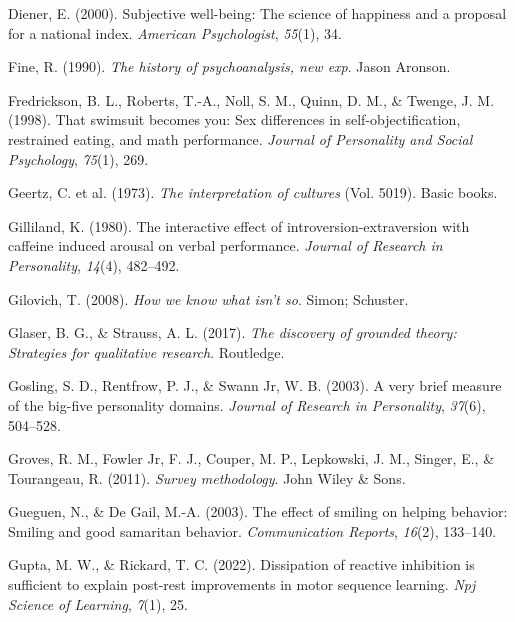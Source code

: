 \documentclass[
]{krantz}
\newlength{\cslhangindent}
\newenvironment{CSLReferences}[2] %
 {\begin{list}{}{%
  \setlength{\itemindent}{0pt}
  \setlength{\leftmargin}{0pt}
  \setlength{\parsep}{0pt}
  \ifodd #1
   \setlength{\leftmargin}{\cslhangindent}
   \setlength{\itemindent}{-1\cslhangindent}
  \fi
  \setlength{\itemsep}{#2\baselineskip}}}
 {\end{list}}
\begin{document}
\begin{CSLReferences}{1}{0}
Diener, E. (2000). Subjective well-being: The science of happiness and a proposal for a national index. \emph{American Psychologist}, \emph{55}(1), 34.

Fine, R. (1990). \emph{The history of psychoanalysis, new exp}. Jason Aronson.

Fredrickson, B. L., Roberts, T.-A., Noll, S. M., Quinn, D. M., \& Twenge, J. M. (1998). That swimsuit becomes you: Sex differences in self-objectification, restrained eating, and math performance. \emph{Journal of Personality and Social Psychology}, \emph{75}(1), 269.

Geertz, C. et al. (1973). \emph{The interpretation of cultures} (Vol. 5019). Basic books.

Gilliland, K. (1980). The interactive effect of introversion-extraversion with caffeine induced arousal on verbal performance. \emph{Journal of Research in Personality}, \emph{14}(4), 482--492.

Gilovich, T. (2008). \emph{How we know what isn't so}. Simon; Schuster.

Glaser, B. G., \& Strauss, A. L. (2017). \emph{The discovery of grounded theory: Strategies for qualitative research}. Routledge.

Gosling, S. D., Rentfrow, P. J., \& Swann Jr, W. B. (2003). A very brief measure of the big-five personality domains. \emph{Journal of Research in Personality}, \emph{37}(6), 504--528.

Groves, R. M., Fowler Jr, F. J., Couper, M. P., Lepkowski, J. M., Singer, E., \& Tourangeau, R. (2011). \emph{Survey methodology}. John Wiley \& Sons.

Gueguen, N., \& De Gail, M.-A. (2003). The effect of smiling on helping behavior: Smiling and good samaritan behavior. \emph{Communication Reports}, \emph{16}(2), 133--140.

Gupta, M. W., \& Rickard, T. C. (2022). Dissipation of reactive inhibition is sufficient to explain post-rest improvements in motor sequence learning. \emph{Npj Science of Learning}, \emph{7}(1), 25.


\end{CSLReferences}
\end{document}
